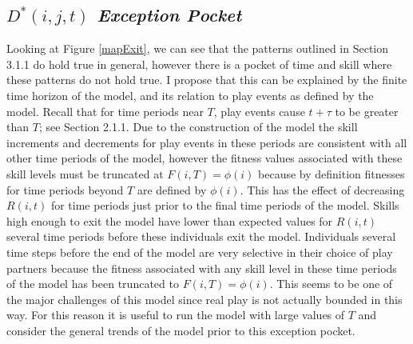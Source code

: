 \documentclass[12pt,letterpaper]{article}
\begin{document}
  \subsection{\it $D^*(i,j,t)$ Exception Pocket}
      Looking at Figure \ref{mapExit}, we can see that the patterns outlined in Section 3.1.1 do hold true in general, however there is a pocket of time and skill where these patterns do not hold true.
      I propose that this can be explained by the finite time horizon of the model, and its relation to play events as defined by the model. 
      Recall that for time periods near $T$, play events cause $t+\tau$ to be greater than $T$; see Section 2.1.1.   
      Due to the construction of the model the skill increments and decrements for play events in these periods are consistent with all other time periods of the model, however the fitness values associated with these skill levels must be truncated at $F(i,T)=\phi(i)$ because by definition fitnesses for time periods beyond $T$ are defined by $\phi(i)$. %
      This has the effect of decreasing $R(i,t)$ for time periods just prior to the final time periods of the model.
      Skills high enough to exit the model have lower than expected values for $R(i,t)$ several time periods before these individuals exit the model.  %
      Individuals several time steps before the end of the model are very selective in their choice of play partners because the fitness associated with any skill level in these time periods of the model has been truncated to $F(i,T)=\phi(i)$. %
      This seems to be one of the major challenges of this model since real play is not actually bounded in this way. 
      For this reason it is useful to run the model with large values of $T$ and consider the general trends of the model prior to this exception pocket. 
      
\end{document}
